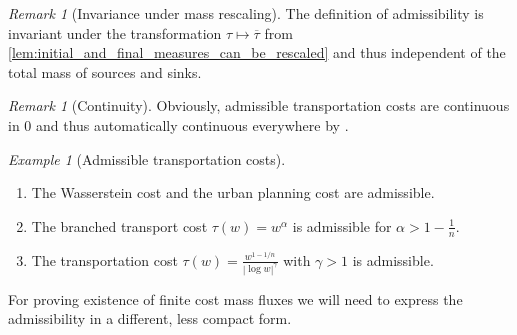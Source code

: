 \documentclass[10pt,a4paper,oneside,final]{article}
\newcommand{\transportPaths}{mass fluxes}
\numberwithin{equation}{section}
\theoremstyle{plain}
\theoremstyle{definition}
\theoremstyle{remark}
\newtheorem{remark}[theorem]{Remark}
\newtheorem{example}[theorem]{Example}
\begin{document}
\begin{remark}[Invariance under mass rescaling]
The definition of admissibility is invariant under the transformation $\tau\mapsto\overline\tau$ from \cref{lem:initial_and_final_measures_can_be_rescaled}
and thus independent of the total mass of sources and sinks.
\end{remark}

\begin{remark}[Continuity]
Obviously, admissible transportation costs are continuous in 0 and thus automatically continuous everywhere by \cite[Thm.\,16.2.1]{Ku09}.
\end{remark}

\begin{example}[Admissible transportation costs]
\begin{enumerate}
\item The Wasserstein cost and the urban planning cost are admissible.
\item The branched transport cost $\tau(w)=w^\alpha$ is admissible for $\alpha>1-\frac1n$.
\item The transportation cost $\tau(w)=\frac{w^{1-1/n}}{|\log w|^\gamma}$ with $\gamma>1$ is admissible.
\end{enumerate}
\end{example}

For proving existence of finite cost \transportPaths{} we will need to express the admissibility in a different, less compact form.
\end{document}

